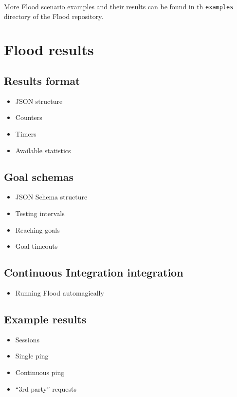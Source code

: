 \documentclass[a4paper]{article}
\begin{document}
More Flood scenario examples and their results can be found in th \texttt{examples} directory of the Flood repository.

\pagebreak
\section{Flood results}
\label{sec-4}
\label{ref-results}
\subsection{Results format}
\label{sec-4-1}


\begin{itemize}
\item JSON structure
\item Counters
\item Timers
\item Available statistics
\end{itemize}
\subsection{Goal schemas}
\label{sec-4-2}
\label{ref-goal_schemas}


\begin{itemize}
\item JSON Schema structure
\item Testing intervals
\item Reaching goals
\item Goal timeouts
\end{itemize}
\subsection{Continuous Integration integration}
\label{sec-4-3}


\begin{itemize}
\item Running Flood automagically
\end{itemize}
\subsection{Example results}
\label{sec-4-4}
\label{ref-example_results}



\begin{itemize}
\item Sessions
\item Single ping
\item Continuous ping
\item ``3rd party'' requests
\end{itemize}
\end{document}
